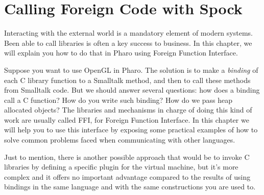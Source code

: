\documentclass[a4paper,10pt,twoside]{book}
\begin{document}
	\sloppy
\fi


\newcommand{\Spock}[0]{Spock } %
\chapter{Calling Foreign Code with Spock}\label{cha:alien}


Interacting with the external world is a mandatory element of modern systems. Been able to call libraries is often a key success to business. In this chapter, we will explain you how to do that in Pharo using Foreign Function Interface. 


Suppose you want to use OpenGL in Pharo. %
The solution is to make a \emph{binding} of each C library function to a Smalltalk method,  and then to call these methods from Smalltalk code. But we should answer several questions: how does a binding call a 
C function? How do you write such binding? How do we pass heap allocated objects? The libraries and mechanisms in charge of doing this kind of work are usually called FFI, for Foreign Function Interface. In this chapter we will help you to use this interface by exposing some practical examples of
how to solve common problems faced when communicating with other languages.


Just to mention, there is another possible approach that would be to invoke C libraries by defining a specific plugin for the virtual machine, but it's more complex and it offers no important advantage compared to the results of using bindings in the same language and with the same constructions you are used to.
\end{document}
